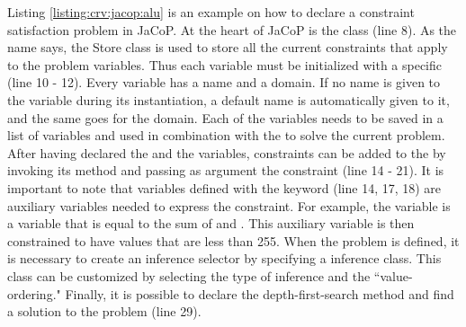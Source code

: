 \par Listing \ref{listing:crv:jacop:alu} is an example on how to declare a
constraint satisfaction problem in JaCoP. At the heart of JaCoP is the class
 (line 8). As the name says, the Store class is used to store all
the current constraints that apply to the problem variables. Thus each variable
must be initialized with a specific  (line 10 - 12). Every variable
has a name and a domain. If no name is given to the variable during its
instantiation, a default name is automatically given to it, and the same goes
for the domain. Each of the variables needs to be saved in a list of variables
and used in combination with the  to solve the current problem.
After having declared the  and the variables, constraints can be
added to the  by invoking its method  and passing as
argument the constraint (line 14 - 21). It is important to note that variables
defined with the  keyword (line 14, 17, 18) are auxiliary variables
needed to express the constraint. For example, the variable  is a
variable that is equal to the sum of  and . This auxiliary
variable is then constrained to have values that are less than 255. When the
problem is defined, it is necessary to create an inference selector by
specifying a  inference class. This class can be
customized by selecting the type of inference and the ``value-ordering."
Finally, it is possible to declare the depth-first-search method and find a
solution to the problem (line 29).

